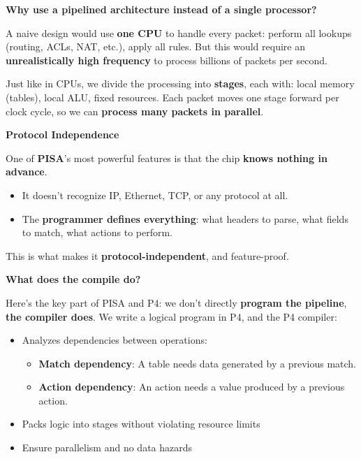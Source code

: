 \highspace
\begin{flushleft}
    \textcolor{Green3}{ \textbf{Why use a pipelined architecture instead of a single processor?}}
\end{flushleft}
A naive design would use \textbf{one CPU} to handle every packet: perform all lookups (routing, ACLs, NAT, etc.), apply all rules. But this would require an \textbf{unrealistically high frequency} to process billions of packets per second.

\highspace
Just like in CPUs, we divide the processing into \textbf{stages}, each with: local memory (tables), local ALU, fixed resources. Each packet moves one stage forward per clock cycle, so we can \textbf{process many packets in parallel}.

\highspace
\begin{flushleft}
    \textcolor{Green3}{ \textbf{Protocol Independence}}
\end{flushleft}
One of \textbf{PISA}'s most powerful features is that the chip \textbf{knows nothing in advance}.
\begin{itemize}
    \item It doesn't recognize IP, Ethernet, TCP, or any protocol at all.
    \item The \textbf{programmer defines everything}: what headers to parse, what fields to match, what actions to perform.
\end{itemize}
This is what makes it \textbf{protocol-independent}, and feature-proof.

\highspace
\begin{flushleft}
    \textcolor{Green3}{ \textbf{What does the compile do?}}
\end{flushleft}
Here's the key part of PISA and P4: we don't directly \textbf{program the pipeline}, \textbf{the compiler does}. We write a logical program in P4, and the P4 compiler:
\begin{itemize}
    \item Analyzes dependencies between operations:
    \begin{itemize}
        \item \textbf{Match dependency}: A table needs data generated by a previous match.
        \item \textbf{Action dependency}: An action needs a value produced by a previous action.
    \end{itemize}
    \item Packs logic into stages without violating resource limits
    \item Ensure parallelism and no data hazards
\end{itemize}